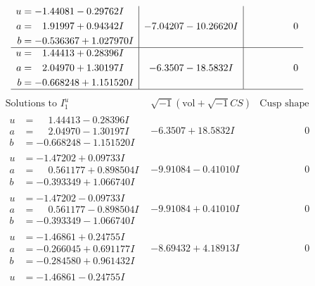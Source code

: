 \documentclass[1p]{elsarticle_modified}
\theoremstyle{definition}
\newcommand{\I}{\sqrt{-1}}
\begin{document}
$$\begin{array}{c|c|c}
\begin{aligned}
u &= -1.44081 - 0.29762 I \\
a &= \phantom{-}1.91997 + 0.94342 I \\
b &= -0.536367 + 1.027970 I\end{aligned}
 & -7.04207 - 10.26620 I & \phantom{-0.000000 } 0 \\ \hline\begin{aligned}
u &= \phantom{-}1.44413 + 0.28396 I \\
a &= \phantom{-}2.04970 + 1.30197 I \\
b &= -0.668248 + 1.151520 I\end{aligned}
 & -6.3507 - 18.5832 I & \phantom{-0.000000 } 0\\
 \hline 
 \end{array}$$\newpage$$\begin{array}{c|c|c}  
\text{Solutions to }I^u_{1}& \I (\text{vol} + \sqrt{-1}CS) & \text{Cusp shape}\\
 \hline 
\begin{aligned}
u &= \phantom{-}1.44413 - 0.28396 I \\
a &= \phantom{-}2.04970 - 1.30197 I \\
b &= -0.668248 - 1.151520 I\end{aligned}
 & -6.3507 + 18.5832 I & \phantom{-0.000000 } 0 \\ \hline\begin{aligned}
u &= -1.47202 + 0.09733 I \\
a &= \phantom{-}0.561177 + 0.898504 I \\
b &= -0.393349 + 1.066740 I\end{aligned}
 & -9.91084 - 0.41010 I & \phantom{-0.000000 } 0 \\ \hline\begin{aligned}
u &= -1.47202 - 0.09733 I \\
a &= \phantom{-}0.561177 - 0.898504 I \\
b &= -0.393349 - 1.066740 I\end{aligned}
 & -9.91084 + 0.41010 I & \phantom{-0.000000 } 0 \\ \hline\begin{aligned}
u &= -1.46861 + 0.24755 I \\
a &= -0.266045 + 0.691177 I \\
b &= -0.284580 + 0.961432 I\end{aligned}
 & -8.69432 + 4.18913 I & \phantom{-0.000000 } 0 \\ \hline\begin{aligned}
u &= -1.46861 - 0.24755 I \\

\end{aligned}
\end{array}$$
\end{document}
